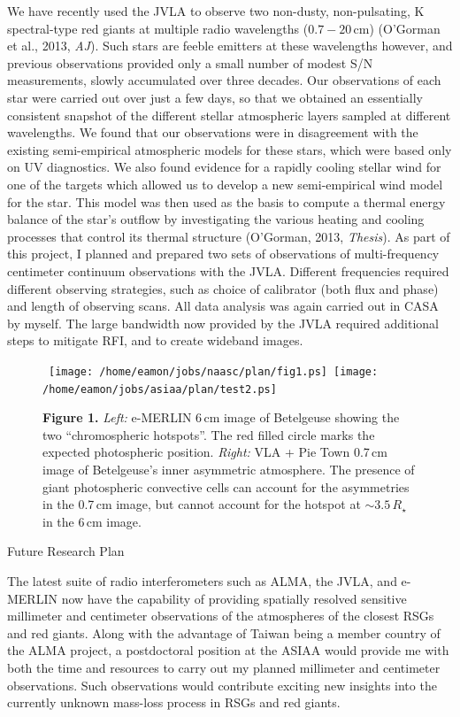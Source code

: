 \documentclass[11pt]{letter} %
\begin{document}
We have recently used the JVLA to observe two non-dusty, non-pulsating, K spectral-type red giants at multiple radio wavelengths ($0.7 - 20$\,cm) (O'Gorman et al., 2013, \textit{AJ}). Such stars are feeble emitters at these wavelengths however, and previous observations provided only a small number of modest S/N measurements, slowly accumulated over three decades. Our observations of each star were carried out over just a few days, so that we obtained an essentially consistent snapshot of the different stellar atmospheric layers sampled at different wavelengths. We found that our observations were in disagreement with the existing semi-empirical atmospheric models for these stars, which were based only on UV diagnostics. We also found evidence for a rapidly cooling stellar wind for one of the targets which allowed us to develop a new semi-empirical wind model for the star. This model was then used as the basis to compute a thermal energy balance of the star's outflow by investigating the various heating and cooling processes that control its thermal structure (O'Gorman, 2013, \textit{Thesis}). As part of this project, I planned and prepared two sets of observations of multi-frequency centimeter continuum observations with the JVLA. Different frequencies required different observing strategies, such as choice of calibrator (both flux and phase) and length of observing scans. All data analysis was again carried out in CASA by myself. The large bandwidth now provided by the JVLA required additional steps to mitigate RFI, and to create wideband images.

\begin{figure}[!ht]
\centering 
\mbox{
          \texttt{[image: /home/eamon/jobs/naasc/plan/fig1.ps]}
          \texttt{[image: /home/eamon/jobs/asiaa/plan/test2.ps]}
          }
\caption{ {\small  \textbf{Figure 1.} \textit{Left:} e-MERLIN 6\,cm image of Betelgeuse showing the two ``chromospheric hotspots''. The red filled circle marks the expected photospheric position. \textit{Right:} VLA + Pie Town 0.7\,cm image of Betelgeuse's inner asymmetric atmosphere. The presence of giant photospheric convective cells can account for the asymmetries in the 0.7\,cm image, but cannot account for the hotspot at $\sim 3.5\,R_{\star}$ in the 6\,cm image.}}
\end{figure}

{\Large 
\begin{center}
Future Research Plan
\end{center}
}
The latest suite of radio interferometers such as ALMA, the JVLA, and e-MERLIN now have the capability of providing spatially resolved sensitive millimeter and centimeter observations of the atmospheres of the closest RSGs and red giants. Along with the advantage of Taiwan being a member country of the ALMA project, a postdoctoral position at the ASIAA would provide me with both the time and resources to carry out my planned millimeter and centimeter observations. Such observations would contribute exciting new insights into the currently unknown mass-loss process in RSGs and red giants. 
\end{document}
